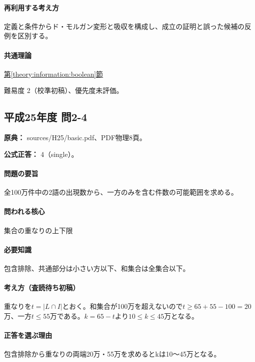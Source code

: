 \paragraph{再利用する考え方} 定義と条件からド・モルガン変形と吸収を構成し、成立の証明と誤った候補の反例を区別する。

\paragraph{共通理論} \hyperref[theory:information:boolean]{第\ref*{theory:information:boolean}節}

\par 難易度 2（校準初稿）、優先度未評価。

\subsection{平成25年度 問2-4}
\label{q:h25-reg-basic-2-4}

\noindent\textbf{原典：} sources/H25/basic.pdf、PDF物理8頁。

\textbf{公式正答：} 4（single）。

\paragraph{問題の要旨} 全100万件中の2語の出現数から、一方のみを含む件数の可能範囲を求める。

\paragraph{問われる核心} 集合の重なりの上下限

\paragraph{必要知識} 包含排除、共通部分は小さい方以下、和集合は全集合以下。

\paragraph{考え方（査読待ち初稿）} 重なりを\(t=|L\cap I|\)とおく。和集合が100万を超えないので\(t\ge65+55-100=20\)万、一方\(t\le55\)万である。\(k=65-t\)より\(10\le k\le45\)万となる。

\paragraph{正答を選ぶ理由} 包含排除から重なりの両端20万・55万を求めるとkは10〜45万となる。

